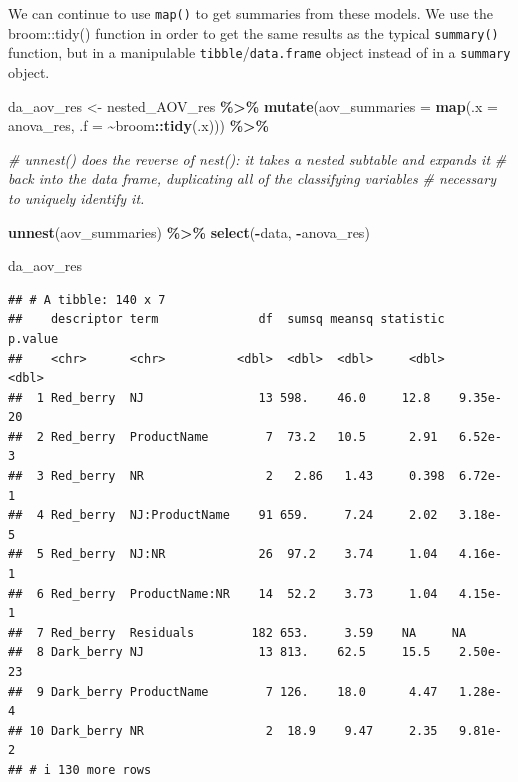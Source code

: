 \documentclass[
]{book}
\newenvironment{Shaded}{\begin{snugshade}}{\end{snugshade}}
\newcommand{\AttributeTok}[1]{\textcolor[rgb]{0.13,0.29,0.53}{#1}}
\newcommand{\CommentTok}[1]{\textcolor[rgb]{0.56,0.35,0.01}{\textit{#1}}}
\newcommand{\FunctionTok}[1]{\textcolor[rgb]{0.13,0.29,0.53}{\textbf{#1}}}
\newcommand{\NormalTok}[1]{#1}
\newcommand{\OtherTok}[1]{\textcolor[rgb]{0.56,0.35,0.01}{#1}}
\newcommand{\SpecialCharTok}[1]{\textcolor[rgb]{0.81,0.36,0.00}{\textbf{#1}}}
\begin{document}
We can continue to use \texttt{map()} to get summaries from these models. We use the broom::tidy() function in order to get the same results as the typical \texttt{summary()} function, but in a manipulable \texttt{tibble}/\texttt{data.frame} object instead of in a \texttt{summary} object.

\begin{Shaded}
\begin{Highlighting}[]
\NormalTok{da\_aov\_res }\OtherTok{\textless{}{-}}
\NormalTok{  nested\_AOV\_res }\SpecialCharTok{\%\textgreater{}\%}
  \FunctionTok{mutate}\NormalTok{(}\AttributeTok{aov\_summaries =} \FunctionTok{map}\NormalTok{(}\AttributeTok{.x =}\NormalTok{ anova\_res, }
                             \AttributeTok{.f =} \SpecialCharTok{\textasciitilde{}}\NormalTok{broom}\SpecialCharTok{::}\FunctionTok{tidy}\NormalTok{(.x))) }\SpecialCharTok{\%\textgreater{}\%}
  
  \CommentTok{\# unnest() does the reverse of nest(): it takes a nested subtable and expands it}
  \CommentTok{\# back into the data frame, duplicating all of the classifying variables}
  \CommentTok{\# necessary to uniquely identify it.}
  
  \FunctionTok{unnest}\NormalTok{(aov\_summaries) }\SpecialCharTok{\%\textgreater{}\%}
  \FunctionTok{select}\NormalTok{(}\SpecialCharTok{{-}}\NormalTok{data, }\SpecialCharTok{{-}}\NormalTok{anova\_res)}

\NormalTok{da\_aov\_res}
\end{Highlighting}
\end{Shaded}

\begin{verbatim}
## # A tibble: 140 x 7
##    descriptor term              df  sumsq meansq statistic   p.value
##    <chr>      <chr>          <dbl>  <dbl>  <dbl>     <dbl>     <dbl>
##  1 Red_berry  NJ                13 598.    46.0     12.8    9.35e-20
##  2 Red_berry  ProductName        7  73.2   10.5      2.91   6.52e- 3
##  3 Red_berry  NR                 2   2.86   1.43     0.398  6.72e- 1
##  4 Red_berry  NJ:ProductName    91 659.     7.24     2.02   3.18e- 5
##  5 Red_berry  NJ:NR             26  97.2    3.74     1.04   4.16e- 1
##  6 Red_berry  ProductName:NR    14  52.2    3.73     1.04   4.15e- 1
##  7 Red_berry  Residuals        182 653.     3.59    NA     NA       
##  8 Dark_berry NJ                13 813.    62.5     15.5    2.50e-23
##  9 Dark_berry ProductName        7 126.    18.0      4.47   1.28e- 4
## 10 Dark_berry NR                 2  18.9    9.47     2.35   9.81e- 2
## # i 130 more rows
\end{verbatim}
\end{document}

